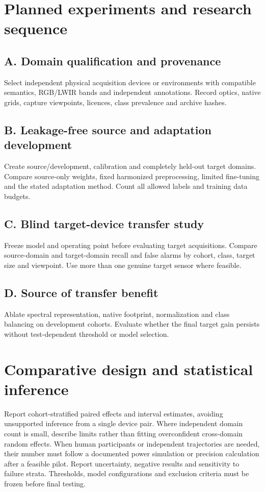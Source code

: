 \documentclass[11pt,a4paper]{article}
\begin{document}
\section{Planned experiments and research sequence}
\subsection{A. Domain qualification and provenance}
Select independent physical acquisition devices or environments with compatible semantics, RGB/LWIR bands and independent annotations. Record optics, native grids, capture viewpoints, licences, class prevalence and archive hashes.

\subsection{B. Leakage-free source and adaptation development}
Create source/development, calibration and completely held-out target domains. Compare source-only weights, fixed harmonized preprocessing, limited fine-tuning and the stated adaptation method. Count all allowed labels and training data budgets.

\subsection{C. Blind target-device transfer study}
Freeze model and operating point before evaluating target acquisitions. Compare source-domain and target-domain recall and false alarms by cohort, class, target size and viewpoint. Use more than one genuine target sensor where feasible.

\subsection{D. Source of transfer benefit}
Ablate spectral representation, native footprint, normalization and class balancing on development cohorts. Evaluate whether the final target gain persists without test-dependent threshold or model selection.

\section{Comparative design and statistical inference}
Report cohort-stratified paired effects and interval estimates, avoiding unsupported inference from a single device pair. Where independent domain count is small, describe limits rather than fitting overconfident cross-domain random effects. When human participants or independent trajectories are needed, their number must follow a documented power simulation or precision calculation after a feasible pilot. Report uncertainty, negative results and sensitivity to failure strata. Thresholds, model configurations and exclusion criteria must be frozen before final testing.
\end{document}
